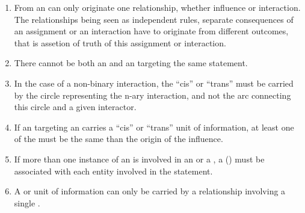 \begin{enumerate}
\item From an  can only originate one relationship, whether influence or interaction. The relationships being seen as independent rules, separate consequences of an assignment or an interaction have to originate from different outcomes, that is assetion of truth of this assignment or interaction.
\item There cannot be both an  and an  targeting the same statement.
\item In the case of a non-binary interaction, the ``cis'' or ``trans''  must be carried by the circle representing the n-ary interaction, and not the arc connecting this circle and a given interactor.
\item If an  targeting an  carries a ``cis'' or ``trans'' unit of information, at least one of the  must be the same  than the origin of the influence. 
\item If more than one instance of an  is involved in an  or a , a   () must be associated with each entity involved in the statement.
\item A  or  unit of information can only be carried by a relationship involving a single .
\end{enumerate}  

